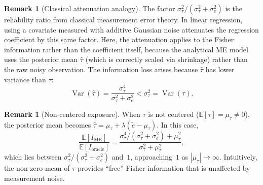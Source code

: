 \documentclass[11pt,a4paper]{article}
\theoremstyle{definition}
\newtheorem{remark}[theorem]{Remark}
\DeclareMathOperator{\Var}{Var}
\begin{document}
\begin{remark}[Classical attenuation analogy]\label{rem:attenuation}
The factor $\sigma_\tau^2/(\sigma_\tau^2+\sigma_e^2)$
is the reliability ratio from classical measurement error theory.
In linear regression, using a covariate measured with additive Gaussian noise
attenuates the regression coefficient by this same factor.
Here, the attenuation applies to the Fisher information rather than the
coefficient itself, because the analytical ME model uses the posterior mean
$\hat\tau$ (which is correctly scaled via shrinkage) rather than the raw
noisy observation.
The information loss arises because $\hat\tau$ has lower variance than $\tau$:
\[
  \Var(\hat\tau) = \frac{\sigma_\tau^4}{\sigma_\tau^2+\sigma_e^2}
  < \sigma_\tau^2 = \Var(\tau).
\]
\end{remark}


\begin{remark}[Non-centered exposure]\label{rem:noncentered}
When $\tau$ is not centered ($\mathbb{E}[\tau]=\mu_\tau\ne 0$),
the posterior mean becomes
$\hat\tau = \mu_\tau + \lambda(\tilde{e}-\mu_\tau)$.
In this case,
\[
  \frac{\mathbb{E}[I_{\mathrm{ME}}]}{\mathbb{E}[I_{\mathrm{oracle}}]}
  = \frac{\sigma_\tau^4/(\sigma_\tau^2+\sigma_e^2)+\mu_\tau^2}
         {\sigma_\tau^2+\mu_\tau^2},
\]
which lies between $\sigma_\tau^2/(\sigma_\tau^2+\sigma_e^2)$ and~$1$,
approaching~$1$ as $|\mu_\tau|\to\infty$.
Intuitively, the non-zero mean of $\tau$ provides ``free'' Fisher information
that is unaffected by measurement noise.
\end{remark}
\end{document}
